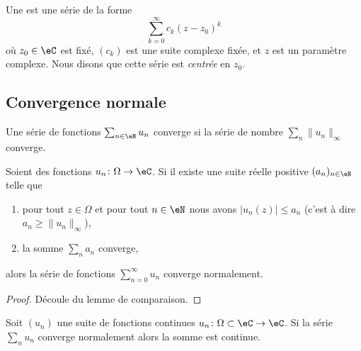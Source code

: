 Une  est une série de la forme
\begin{equation}		\label{eqseriepuissance}
	\sum_{k=0}^{\infty}c_k(z-z_0)^k
\end{equation}
où $z_0\in \eC$ est fixé, $(c_k)$ est une suite complexe fixée, et $z$ est un paramètre complexe. Nous disons que cette série est \emph{centrée} en $z_0$.



\subsection{Convergence normale}

Une série de fonctions \( \sum_{n\in \eN}u_n \) converge  si la série de nombre \( \sum_n\| u_n \|_{\infty}\) converge.

\begin{lemma}
    Soient des fonctions \( u_n\colon \Omega\to \eC\). Si il existe une suite réelle positive \( (a_n)_{n\in \eN}\) telle que
    \begin{enumerate}
        \item
            pour tout \( z\in \Omega\) et pour tout \( n\in \eN\) nous avons \( | u_n(z) |\leq a_n\) (c'est à dire \( a_n\geq \| u_n \|_{\infty}\)),
        \item
            la somme \( \sum_{n}a_n\) converge,
    \end{enumerate}
    alors la série de fonctions \( \sum_{n=0}^{\infty}u_n\) converge normalement.
\end{lemma}

\begin{proof}
    Découle du lemme de comparaison.
\end{proof}

\begin{proposition}     \label{PropUEMoNF}
    Soit \( (u_n)\) une suite de fonctions continues \( u_n\colon \Omega\subset\eC\to \eC\). Si la série \( \sum_nu_n\) converge normalement alors la somme est continue.
\end{proposition}

